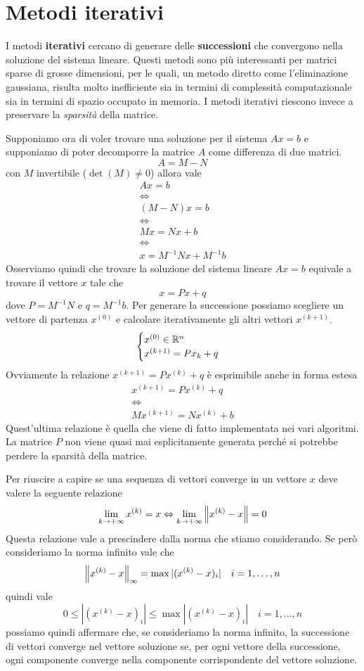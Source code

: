 \chapter{Metodi iterativi}
I metodi \textbf{iterativi} cercano di generare delle \textbf{successioni} che convergono nella soluzione
del sistema lineare. Questi metodi sono più interessanti per matrici sparse di grosse dimensioni, per le quali,
un metodo diretto come l'eliminazione gaussiana, risulta molto inefficiente sia in termini di complessità
computazionale sia in termini di spazio occupato in memoria. I metodi iterativi riescono invece a preservare la
\emph{sparsità} della matrice.

Supponiamo ora di voler trovare una soluzione per il sistema $Ax = b$ e supponiamo di poter decomporre la matrice
$A$ come differenza di due matrici.
\[ A = M - N \]
con $M$ invertibile ($\det(M) \neq 0$) allora vale
\begin{gather*}
	Ax = b \\
	\Leftrightarrow \\
	(M - N) x = b \\
	\Leftrightarrow \\
	M x = N x + b \\
	\Leftrightarrow \\
	x = M^{-1} N x + M^{-1} b
\end{gather*}
Osserviamo quindi che trovare la soluzione del sistema lineare $Ax = b$ equivale a trovare il vettore $x$ tale che
\[ x = Px + q \]
dove $P = M^{-1} N$ e $q = M^{-1} b$. Per generare la successione possiamo scegliere un vettore di partenza
$x^{(0)}$ e calcolare iterativamente gli altri vettori $x^{(k+1)}$.
\[
	\begin{cases}
		x^{(0)} \in \mathbb{R}^n \\
		x^{(k+1)} = P x_k + q
	\end{cases}
\]
Ovviamente la relazione $x^{(k+1)} = P x^{(k)} + q$ è esprimibile anche in forma estesa
\begin{gather*}
	x^{(k+1)} = P x^{(k)} + q \\
	\Leftrightarrow         \\
	M x^{(k+1)} = N x^{(k)} + b
\end{gather*}
Quest'ultima relazione è quella che viene di fatto implementata nei vari algoritmi. La matrice $P$ non viene quasi
mai esplicitamente generata perché si potrebbe perdere la sparsità della matrice.

Per riuscire a capire se una sequenza di vettori converge in un vettore $x$ deve valere la seguente relazione
\[ \lim_{k \to +\infty} x^{(k)} = x \Leftrightarrow \lim_{k \to +\infty} \left\lVert x^{(k)} - x\right\rVert = 0 \]
Questa relazione vale a prescindere dalla norma che stiamo considerando. Se però consideriamo la norma infinito
vale che
\[ \left\lVert x^{(k)} - x\right\rVert_\infty = \max | (x^{(k)} - x)_i | \quad i = 1, \dots, n \]
quindi vale
\[ 0 \leq | (x^{(k)} - x)_i | \leq \max | (x^{(k)} - x)_i | \quad i = 1, \dots, n \]
possiamo quindi affermare che, se consideriamo la norma infinito, la successione di vettori converge nel vettore
soluzione se, per ogni vettore della successione, ogni componente converge nella componente corrispondente del
vettore soluzione.

